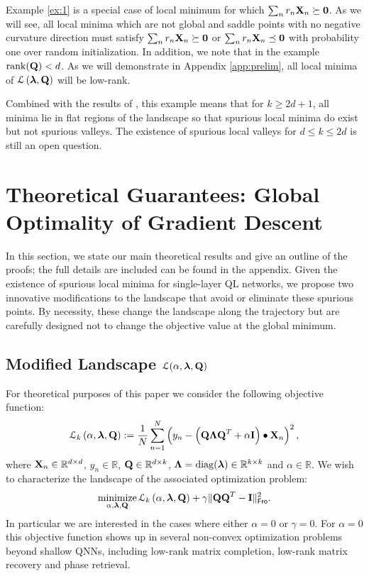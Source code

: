 \documentclass[11pt]{article}
\theoremstyle{plain}
\DeclareMathOperator*{\minimize}{minimize}
\DeclareMathOperator*{\rank}{rank}
\DeclareMathOperator*{\diag}{diag}
\DeclareMathOperator*{\llq}{\ensuremath{\mathcal{L} \left(\V{\lambda},\Mx{Q}\right)} }
\def\R{\mathbb{R}}
\theoremstyle{plain}
\numberwithin{equation}{section}
\numberwithin{lemma}{section}
\numberwithin{theorem}{section}
\numberwithin{corollary}{section}
\numberwithin{observation}{section}
\numberwithin{definition}{section}
\numberwithin{example}{section}
\begin{document}
Example \ref{ex:1} is a special case of local minimum for which $\sum_{n}r_n \Mx{X}_n \succeq \Mx{0}$. As we will see, all local minima which are not global and saddle points with no negative curvature direction must satisfy $\sum_{n}r_n \Mx{X}_n \succeq \Mx{0}$ or $\sum_{n}r_n \Mx{X}_n \preceq \Mx{0}$ with probability one over random initialization. In addition, we note that in the example $\rank(\Mx{Q}) < d$. As we will demonstrate in Appendix \ref{app:prelim}, all local minima of $\llq$ will be low-rank.

Combined with the results of \cite{venturi2019spurious}, this example means that for $k \geq 2d + 1$, all minima lie in flat regions of the landscape so that spurious local minima do exist but not spurious valleys.  The existence of spurious local valleys for $d \leq k \leq 2d$ is still an open question.




 

\section{Theoretical Guarantees: Global Optimality of Gradient Descent} \label{sec:theory}
In this section, we state our main theoretical results and give an outline of the proofs; the full details are included can be found in the appendix. Given the existence of spurious local minima for single-layer QL networks, we propose two innovative modifications to the landscape that avoid or eliminate these spurious points.  By necessity, these change the landscape along the trajectory but are carefully designed not to change the objective value at the global minimum.


\subsection{Modified Landscape \texorpdfstring{$\mathcal{L}({\alpha}, \V{\lambda}, \Mx{Q})$}{L(a, l, Q)}}

For theoretical purposes of this paper we consider the following objective function:
\begin{align} \label{eq:L_def_main}
\mathcal{L}_k \left(\alpha, {\V{\lambda}, \Mx{Q}} \right) := \frac{1}{N}\sum_{n = 1}^N \left( y_n -  \left(\Mx{Q \Lambda Q}^T + \alpha \Mx{I} \right) \bullet \Mx{X}_n \right)^2,
\end{align}
\noindent where $\Mx{X}_n \in \mathbb{R}^{d \times d}$, $y_n \in \mathbb{R}$, $\Mx{Q} \in \mathbb{R}^{d \times k}$, $\Mx{\Lambda} = \diag(\V{\lambda}) \in \mathbb{R}^{k \times k}$ and $\alpha \in \R$. 
We wish to characterize the landscape of the associated optimization problem:
\begin{equation} \label{eq:mseloss_main}
\minimize_{\alpha, \V{\lambda}, \Mx{Q}} \mathcal{L}_k \left(\alpha, {\V{\lambda},\Mx{Q}} \right) + \gamma \|\Mx{QQ}^T - \Mx{I}\|_{\sf Fro}^2.
\end{equation}
In particular we are interested in the cases where either $\alpha = 0$ or $\gamma = 0$. For $\alpha = 0$ this objective function shows up in several non-convex optimization problems beyond shallow QNNs, including low-rank matrix completion, low-rank matrix recovery and phase retrieval.
\end{document}
